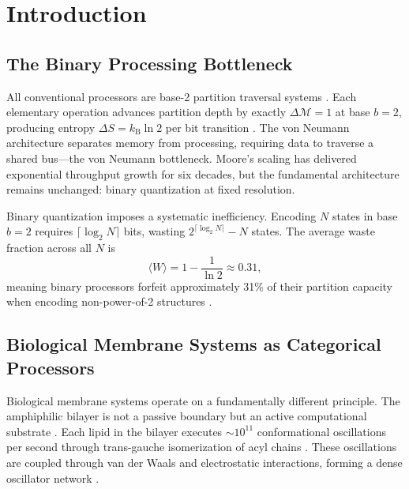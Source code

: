 \documentclass[twocolumn,10pt]{article}
\theoremstyle{remark}
\newcommand{\kB}{k_{\mathrm{B}}}
\newcommand{\Depth}{\mathcal{M}}
\begin{document}
\section{Introduction}
\label{sec:introduction}

\subsection{The Binary Processing Bottleneck}

All conventional processors are base-2 partition traversal systems \cite{turing1936,vonneumann1945}. Each elementary operation advances partition depth by exactly $\Delta\Depth = 1$ at base $b = 2$, producing entropy $\Delta S = \kB \ln 2$ per bit transition \cite{landauer1961}. The von Neumann architecture \cite{vonneumann1945} separates memory from processing, requiring data to traverse a shared bus---the von Neumann bottleneck. Moore's scaling \cite{moore1965} has delivered exponential throughput growth for six decades, but the fundamental architecture remains unchanged: binary quantization at fixed resolution.

Binary quantization imposes a systematic inefficiency. Encoding $N$ states in base $b = 2$ requires $\lceil \log_2 N \rceil$ bits, wasting $2^{\lceil \log_2 N \rceil} - N$ states. The average waste fraction across all $N$ is
\begin{equation}
\langle W \rangle = 1 - \frac{1}{\ln 2} \approx 0.31,
\label{eq:binary_waste}
\end{equation}
meaning binary processors forfeit approximately 31\% of their partition capacity when encoding non-power-of-2 structures \cite{shannon1948}.

\subsection{Biological Membrane Systems as Categorical Processors}

Biological membrane systems operate on a fundamentally different principle. The amphiphilic bilayer is not a passive boundary but an active computational substrate \cite{singer1972,lipowsky1995,gennis1989}. Each lipid in the bilayer executes $\sim 10^{11}$ conformational oscillations per second through trans-gauche isomerization of acyl chains \cite{gennis1989}. These oscillations are coupled through van der Waals and electrostatic interactions, forming a dense oscillator network \cite{israelachvili2011}.
\end{document}

